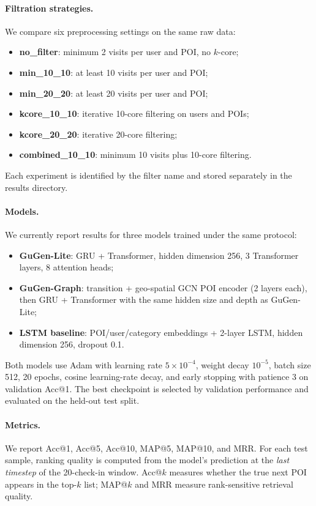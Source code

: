 \documentclass[12pt, journal]{IEEEtran}
\begin{document}
\paragraph{Filtration strategies.}
We compare six preprocessing settings on the same raw data:
\begin{itemize}
    \item \textbf{no\_filter}: minimum 2 visits per user and POI, no $k$-core;
    \item \textbf{min\_10\_10}: at least 10 visits per user and POI;
    \item \textbf{min\_20\_20}: at least 20 visits per user and POI;
    \item \textbf{kcore\_10\_10}: iterative 10-core filtering on users and POIs;
    \item \textbf{kcore\_20\_20}: iterative 20-core filtering;
    \item \textbf{combined\_10\_10}: minimum 10 visits plus 10-core filtering.
\end{itemize}
Each experiment is identified by the filter name and stored separately in the results directory.

\paragraph{Models.}
We currently report results for three models trained under the same protocol:
\begin{itemize}
    \item \textbf{GuGen-Lite}: GRU + Transformer, hidden dimension 256, 3 Transformer layers, 8 attention heads;
    \item \textbf{GuGen-Graph}: transition + geo-spatial GCN POI encoder (2 layers each), then GRU + Transformer with the same hidden size and depth as GuGen-Lite;
    \item \textbf{LSTM baseline}: POI/user/category embeddings + 2-layer LSTM, hidden dimension 256, dropout 0.1.
\end{itemize}
Both models use Adam with learning rate $5 \times 10^{-4}$, weight decay $10^{-5}$, batch size 512, 20 epochs, cosine learning-rate decay, and early stopping with patience 3 on validation Acc@1. The best checkpoint is selected by validation performance and evaluated on the held-out test split.

\paragraph{Metrics.}
We report Acc@1, Acc@5, Acc@10, MAP@5, MAP@10, and MRR. For each test sample, ranking quality is computed from the model's prediction at the \emph{last timestep} of the 20-check-in window. Acc@$k$ measures whether the true next POI appears in the top-$k$ list; MAP@$k$ and MRR measure rank-sensitive retrieval quality.
\end{document}
